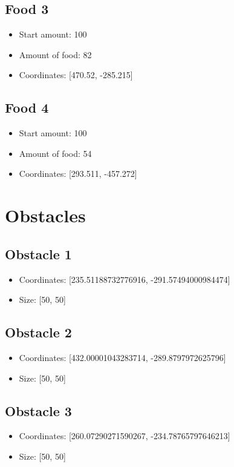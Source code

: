 \documentclass{article}
\begin{document}
\subsection*{Food 3}
\begin{itemize}
\item Start amount: 100
\item Amount of food: 82
\item Coordinates: [470.52, -285.215]
\end{itemize}
\subsection*{Food 4}
\begin{itemize}
\item Start amount: 100
\item Amount of food: 54
\item Coordinates: [293.511, -457.272]
\end{itemize}


    \section{Obstacles}

    \subsection*{Obstacle 1}
\begin{itemize}
\item Coordinates: [235.51188732776916, -291.57494000984474]
\item Size: [50, 50]
\end{itemize}
\subsection*{Obstacle 2}
\begin{itemize}
\item Coordinates: [432.00001043283714, -289.8797972625796]
\item Size: [50, 50]
\end{itemize}
\subsection*{Obstacle 3}
\begin{itemize}
\item Coordinates: [260.07290271590267, -234.78765797646213]
\item Size: [50, 50]
\end{itemize}
\end{document}
